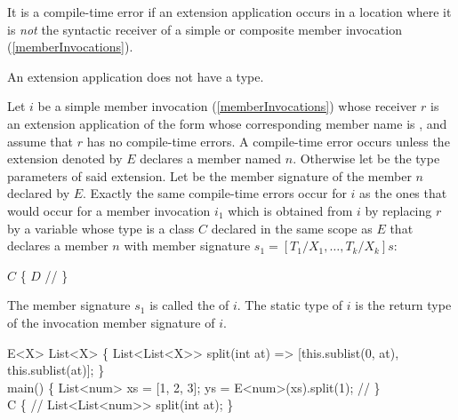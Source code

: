 \documentclass[makeidx]{article}
\begin{document}
\LMHash{}%
It is a compile-time error if an extension application occurs
in a location where it is \emph{not} the syntactic receiver of
a simple or composite member invocation
(\ref{memberInvocations}).


\LMHash{}%
An extension application does not have a type.


\LMHash{}%
%
Let $i$ be a simple member invocation
(\ref{memberInvocations})
whose receiver $r$ is an extension application of the form
%
whose corresponding member name is ,
and assume that $r$ has no compile-time errors.
A compile-time error occurs unless the extension denoted by $E$
declares a member named $n$.
Otherwise let  be
the type parameters of said extension.
Let  be the member signature of the member $n$ declared by $E$.
Exactly the same compile-time errors occur for $i$ as
the ones that would occur for a member invocation $i_1$
which is obtained from $i$ by replacing $r$ by
a variable whose type is
a class $C$ declared in the same scope as $E$
that declares a member $n$ with member signature
$s_1 = [T_1/X_1, \ldots, T_k/X_k]s$:

\begin{normativeDartCode}
\ABSTRACT{} \CLASS{} $C$ \{
  $D$ // 
\}
\end{normativeDartCode}

\LMHash{}%
The member signature $s_1$ is called the
of $i$.
The static type of $i$ is the return type of
the invocation member signature of $i$.

\begin{dartCode}
\EXTENSION{} E<X> \ON{} List<X> \{
  List<List<X>{}> split(int at) =>
      [this.sublist(0, at), this.sublist(at)];
\}
\\
\VOID{} main() \{
  List<num> xs = [1, 2, 3];
  \VAR{} ys = E<num>(xs).split(1); // \comment{(*)}
\}
\\
\ABSTRACT{} \CLASS{} C \{
  // 
  List<List<num>{}> split(int at);
\}
\end{dartCode}
\end{document}
